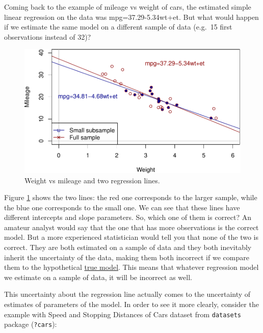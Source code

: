 \documentclass[
]{book}
\theoremstyle{definition}
\theoremstyle{definition}
\theoremstyle{definition}
\theoremstyle{definition}
\theoremstyle{remark}
\begin{document}
Coming back to the example of mileage vs weight of cars, the estimated simple linear regression on the data was mpg=37.29-5.34wt+et. But what would happen if we estimate the same model on a different sample of data (e.g.~15 first observations instead of 32)?

\begin{figure}
\centering
\includegraphics{Svetunkov---Statistics-for-Business-Analytics_files/figure-latex/scatterWeightMPG4-1.pdf}
\caption{\label{fig:scatterWeightMPG4}Weight vs mileage and two regression lines.}
\end{figure}

Figure \ref{fig:scatterWeightMPG4} shows the two lines: the red one corresponds to the larger sample, while the blue one corresponds to the small one. We can see that these lines have different intercepts and slope parameters. So, which one of them is correct? An amateur analyst would say that the one that has more observations is the correct model. But a more experienced statistician would tell you that none of the two is correct. They are both estimated on a sample of data and they both inevitably inherit the uncertainty of the data, making them both incorrect if we compare them to the hypothetical \hyperref[modelsMethods]{true model}. This means that whatever regression model we estimate on a sample of data, it will be incorrect as well.

This uncertainty about the regression line actually comes to the uncertainty of estimates of parameters of the model. In order to see it more clearly, consider the example with Speed and Stopping Distances of Cars dataset from \texttt{datasets} package (\texttt{?cars}):
\end{document}

